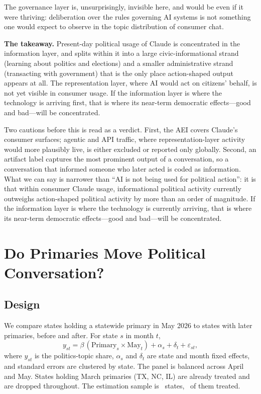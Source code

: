 \documentclass[11pt]{article}
\begin{document}
The governance layer is, unsurprisingly, invisible here, and would be even if it
were thriving: deliberation over the rules governing AI systems is not something
one would expect to observe in the topic distribution of consumer chat.

\textbf{The takeaway.} Present-day political usage of Claude is concentrated in
the information layer, and splits within it into a large civic-informational
strand (learning about politics and elections) and a smaller administrative
strand (transacting with government) that is the only place action-shaped output
appears at all. The representation layer, where AI would act on citizens'
behalf, is not yet visible in consumer usage. If the information layer is where
the technology is arriving first, that is where its near-term democratic
effects---good and bad---will be concentrated.

Two cautions before this is read as a verdict. First, the AEI covers Claude's
consumer surfaces; agentic and API traffic, where representation-layer activity
would more plausibly live, is either excluded or reported only globally.
Second, an artifact label captures the most prominent output of a conversation,
so a conversation that informed someone who later acted is coded as information.
What we can say is narrower than ``AI is not being used for political action'':
it is that within consumer Claude usage, informational political activity
currently outweighs action-shaped political activity by more than an order of
magnitude. If the information layer is where the technology is currently
arriving, that is where its near-term democratic effects---good and bad---will be
concentrated.

\section{Do Primaries Move Political Conversation?}
\label{sec:did}

\subsection{Design}

We compare states holding a statewide primary in May 2026 to states with later
primaries, before and after. For state $s$ in month $t$,
%
\begin{equation}
y_{st} = \beta \,(\text{Primary}_s \times \text{May}_t) + \alpha_s + \delta_t + \varepsilon_{st},
\end{equation}
%
where $y_{st}$ is the politics-topic share, $\alpha_s$ and $\delta_t$ are state
and month fixed effects, and standard errors are clustered by state. The panel is
balanced across April and May. States holding March primaries (TX, NC, IL) are
already treated and are dropped throughout. The estimation sample is
\mainStates\ states, \mainTreated\ of them treated.
\end{document}
